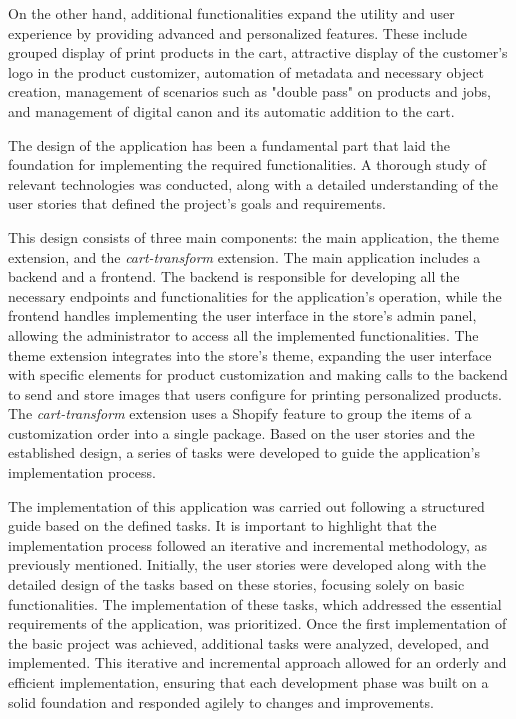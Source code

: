 \documentclass[11pt]{article}
\begin{document}
On the other hand, additional functionalities expand the utility and user experience by providing advanced and personalized features. 
These include grouped display of print products in the cart, attractive display of the customer's logo in the product customizer, 
automation of metadata and necessary object creation, management of scenarios such as "double pass" on products and jobs, and management
of digital canon and its automatic addition to the cart.

The design of the application has been a fundamental part that laid the foundation for implementing the required functionalities. 
A thorough study of relevant technologies was conducted, along with a detailed understanding of the user stories that defined 
the project's goals and requirements.

This design consists of three main components: the main application, the theme extension, and the \textit{cart-transform} extension.
The main application includes a backend and a frontend. The backend is responsible for developing all the necessary 
endpoints and functionalities for the application’s operation, while the frontend handles implementing the user interface 
in the store's admin panel, allowing the administrator to access all the implemented functionalities. The theme extension 
integrates into the store’s theme, expanding the user interface with specific elements for product customization and making 
calls to the backend to send and store images that users configure for printing personalized products. The \textit{cart-transform} 
extension uses a Shopify feature to group the items of a customization order into a single package. Based on the user stories and 
the established design, a series of tasks were developed to guide the application’s implementation process.

The implementation of this application was carried out following a structured guide based on the defined tasks. 
It is important to highlight that the implementation process followed an iterative and incremental methodology, 
as previously mentioned. Initially, the user stories were developed along with the detailed design of the tasks 
based on these stories, focusing solely on basic functionalities. The implementation of these tasks, which addressed 
the essential requirements of the application, was prioritized. Once the first implementation of the basic project was 
achieved, additional tasks were analyzed, developed, and implemented. This iterative and incremental approach allowed 
for an orderly and efficient implementation, ensuring that each development phase was built on a solid foundation and 
responded agilely to changes and improvements.
\end{document}
